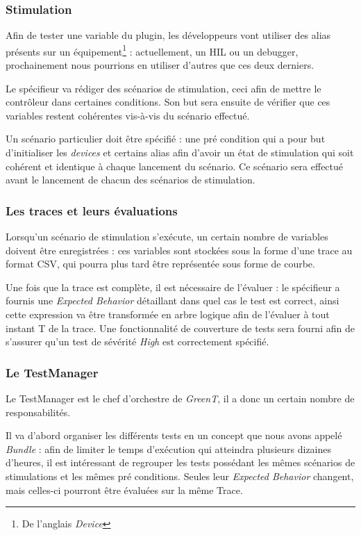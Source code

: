 	\subsubsection{Stimulation} \label{stim}
		Afin de tester une variable du plugin, les développeurs vont utiliser des alias présents sur un équipement\footnote{De l'anglais \textit{Device}} : actuellement, un HIL ou un debugger, prochainement nous pourrions en utiliser d'autres que ces deux derniers.

		Le spécifieur va rédiger des scénarios de stimulation, ceci afin de mettre le contrôleur dans certaines conditions. Son but sera ensuite de vérifier que ces variables restent cohérentes vis-à-vis du scénario effectué. 

		Un scénario particulier doit être spécifié : une pré condition qui a pour but d'initialiser les \textit{devices} et certains alias afin d'avoir un état de stimulation qui soit cohérent et identique à chaque lancement du scénario. Ce scénario sera effectué avant le lancement de chacun des scénarios de stimulation.

	\subsubsection{Les traces et leurs évaluations}\label{expectedBehavior}
	Lorsqu'un scénario de stimulation s'exécute, un certain nombre de variables doivent être enregistrées : ces variables sont stockées sous la forme d'une trace au format CSV, qui pourra plus tard être représentée sous forme de courbe. 

	Une fois que la trace est complète, il est nécessaire de l'évaluer : le spécifieur a fournis une \textit{Expected Behavior} détaillant dans quel cas le test est correct, ainsi cette expression va être transformée en arbre logique afin de l'évaluer à tout instant T de la trace. Une fonctionnalité de couverture de tests sera fourni afin de s'assurer qu'un test de sévérité \textit{High} est correctement spécifié.

	\subsubsection{Le TestManager}\label{testManager}
	Le TestManager est le chef d'orchestre de \textit{GreenT}, il a donc un certain nombre de responsabilités. 

	Il va d'abord organiser les différents tests en un concept que nous avons appelé \textit{Bundle} : afin de limiter le temps d'exécution qui atteindra plusieurs dizaines d'heures, il est intéressant de regrouper les tests possédant les mêmes scénarios de stimulations et les mêmes pré conditions. Seules leur \textit{Expected Behavior} changent, mais celles-ci pourront être évaluées sur la même Trace.

